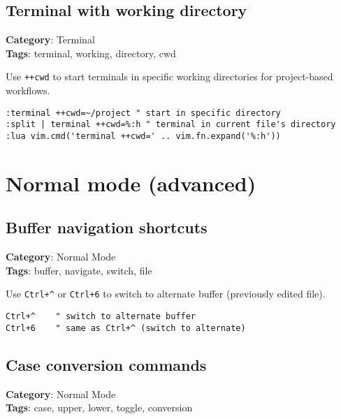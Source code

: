 {{{{{{{{{\section{Terminal with working directory}

\textbf{Category}: Terminal\\ \textbf{Tags}: terminal, working, directory, cwd
\vspace{0.5cm}

Use {\footnotesize \Verb§++cwd§} to start terminals in specific working directories for project-based workflows.

\begin{Exa*}{}
\begin{Verbatim}[fontsize=\footnotesize, breaklines, breakanywhere]
:terminal ++cwd=~/project " start in specific directory
:split | terminal ++cwd=%:h " terminal in current file's directory
:lua vim.cmd('terminal ++cwd=' .. vim.fn.expand('%:h'))
\end{Verbatim}
\end{Exa*}

\chapter{Normal mode (advanced)}
\section{Buffer navigation shortcuts}

\textbf{Category}: Normal Mode\\ \textbf{Tags}: buffer, navigate, switch, file
\vspace{0.5cm}

Use {\footnotesize \Verb§Ctrl+^§} or {\footnotesize \Verb§Ctrl+6§} to switch to alternate buffer (previously edited file).

\begin{Exa*}{}
\begin{Verbatim}[fontsize=\footnotesize, breaklines, breakanywhere]
Ctrl+^    " switch to alternate buffer
Ctrl+6    " same as Ctrl+^ (switch to alternate)
\end{Verbatim}
\end{Exa*}

\section{Case conversion commands}

\textbf{Category}: Normal Mode\\ \textbf{Tags}: case, upper, lower, toggle, conversion
\vspace{0.5cm}

}}}}}}}}}
